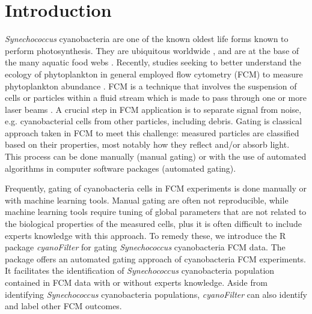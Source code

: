 \documentclass[a4paper,12pt]{extarticle}
\begin{document}
\section{Introduction}
\emph{Synechococcus} cyanobacteria are one of the known oldest life forms known to perform photosynthesis. They are ubiquitous worldwide \citep{Dvorak:2004}, and are at the base of the many aquatic food webs \citep{Kirk:1994}. Recently, studies seeking to better understand the ecology of phytoplankton in general employed flow cytometry (FCM) to measure phytoplankton abundance \citep{Pomati:2013, Fontana:2018}. FCM is a technique that involves the suspension of cells or particles within a fluid stream which is made to pass through one or more laser beams \citep{ONeill:2013}. A crucial step in FCM application is to separate signal from noise, e.g. cyanobacterial cells from other particles, including debris. Gating is classical approach taken in FCM to meet this challenge: measured particles are classified based on their properties, most notably how they reflect and/or absorb light. This process can be done manually (manual gating) or with the use of automated algorithms in computer software packages (automated gating).  

Frequently, gating of cyanobacteria cells in FCM experiments is done manually or with machine learning tools\citep{Malek:2015a}. Manual gating are often not reproducible, while machine learning tools require tuning of global parameters that are not related to the biological properties of the measured cells, plus it is often difficult to include experts knowledge with this approach. To remedy these, we introduce the R package \emph{cyanoFilter} for gating \emph{Synechococcus} cyanobacteria FCM data. The package offers an automated gating approach of cyanobacteria FCM experiments. It facilitates the identification of \emph{Synechococcus} cyanobacteria population contained in FCM data with or without experts knowledge. Aside from identifying \emph{Synechococcus} cyanobacteria populations, \emph{cyanoFilter} can also identify and label other FCM outcomes.%
\end{document}
